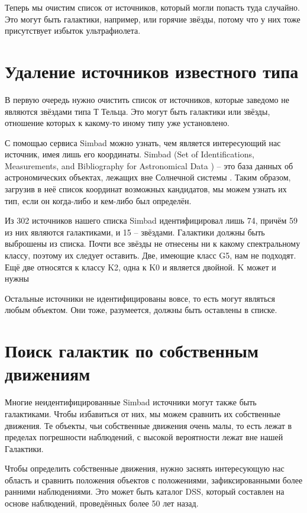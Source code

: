 Теперь мы очистим список от источников, который могли попасть туда случайно. Это могут быть галактики, например, или горячие звёзды, потому что у них тоже присутствует избыток ультрафиолета.

\section{Удаление источников известного типа}
В первую очередь нужно очистить список от источников, которые заведомо не являются звёздами типа Т Тельца. Это могут быть галактики или звёзды, отношение которых к какому-то иному типу уже установлено.

С помощью сервиса Simbad можно узнать, чем является интересующий нас источник, имея лишь его координаты. Simbad (Set of Identifications, Measurements, and Bibliography for Astronomical Data ) -- это база данных об астрономических объектах, лежащих вне Солнечной системы \cite{wenger2000simbad}. Таким образом, загрузив в неё список координат возможных кандидатов, мы можем узнать их тип, если он когда-либо и кем-либо был определён.

Из 302 источников нашего списка Simbad идентифицировал лишь 74, причём 59 из них являются галактиками, и 15 -- звёздами. Галактики должны быть выброшены из списка. Почти все звёзды не отнесены ни к какому спектральному классу, поэтому их следует оставить. Две, имеющие класс G5, нам не подходят. Ещё две относятся к классу K2, одна к K0 и является двойной. K может и нужны

Остальные источники не идентифицированы вовсе, то есть могут являться любым объектом. Они тоже, разумеется, должны быть оставлены в списке.

\section{Поиск галактик по собственным движениям}
Многие неидентифицированные Simbad источники могут также быть галактиками. Чтобы избавиться от них, мы можем сравнить их собственные движения. Те объекты, чьи собственные движения очень малы, то есть лежат в пределах погрешности наблюдений, с высокой вероятности лежат вне нашей Галактики.

Чтобы определить собственные движения, нужно заснять интересующую нас область и сравнить положения объектов с положениями, зафиксированными более ранними наблюдениями. Это может быть каталог DSS, который составлен на основе наблюдений, проведённых более 50 лет назад.

